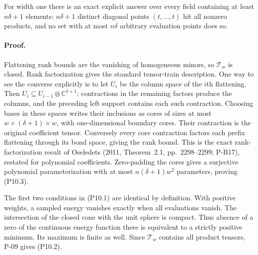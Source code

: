 \documentclass[11pt,a4paper]{article}
\theoremstyle{definition}\newtheorem{definition}{Definition}
\begin{document}
For width one there is an exact explicit answer over every field containing at least $n\delta+1$ elements: $n\delta+1$ distinct diagonal points $(t,\ldots,t)$ hit all nonzero products, and no set with at most $n\delta$ arbitrary evaluation points does so.
\paragraph{Proof.}
Flattening rank bounds are the vanishing of homogeneous minors, so $\mathcal T_w$ is closed. Rank factorization gives the standard tensor-train description. One way to see the converse explicitly is to let $U_i$ be the column space of the $i$th flattening. Then
$U_i\subseteq U_{i-1}\otimes\mathbb C^{\delta+1}$: contractions in the remaining factors produce the columns, and the preceding left support contains each such contraction. Choosing bases in these spaces writes their inclusions as cores of sizes at most $w\times(\delta+1)\times w$, with one-dimensional boundary cores. Their contraction is the original coefficient tensor. Conversely every core contraction factors each prefix flattening through its bond space, giving the rank bound. This is the exact rank-factorization result of Oseledets (2011, Theorem~2.1, pp.~2298--2299; P-B17), restated for polynomial coefficients. Zero-padding the cores gives a surjective polynomial parameterization with at most $n(\delta+1)w^2$ parameters, proving (P10.3).

The first two conditions in (P10.1) are identical by definition. With positive weights, a sampled energy vanishes exactly when all evaluations vanish. The intersection of the closed cone with the unit sphere is compact. Thus absence of a zero of the continuous energy function there is equivalent to a strictly positive minimum. Its maximum is finite as well. Since $\mathcal T_w$ contains all product tensors, P-09 gives (P10.2).
\end{document}

